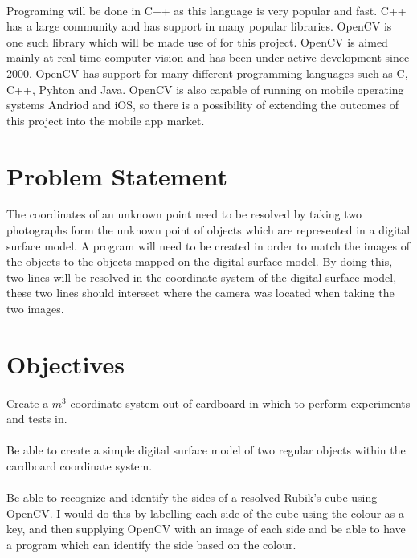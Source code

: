 \documentclass{article}
\begin{document}
\paragraph{}
Programing will be done in C++ as this language is very popular and fast. C++ has a large community and has support in many popular libraries. OpenCV is one such library which will be made use of for this project. OpenCV is aimed mainly at real-time computer vision and has been under active development since 2000. OpenCV has support for many different programming languages such as C, C++, Pyhton and Java. OpenCV is also capable of running on mobile operating systems Andriod and iOS, so there is a possibility of extending the outcomes of this project into the mobile app market.

\newpage

\section{Problem Statement}
The coordinates of an unknown point need to be resolved by taking two photographs form the unknown point of objects which are represented in a digital surface model. A program will need to be created in order to match the images of the objects to the objects mapped on the digital surface model. By doing this, two lines will be resolved in the coordinate system of the digital surface model, these two lines should intersect where the camera was located when taking the two images.

\newpage

\section{Objectives}

\paragraph{}
Create a $m^3$ coordinate system out of cardboard in which to perform experiments and tests in.

\paragraph{}
Be able to create a simple digital surface model of two regular objects within the cardboard coordinate system.

\paragraph{}
Be able to recognize and identify the sides of a resolved Rubik's cube using OpenCV. I would do this by labelling each side of the cube using the colour as a key, and then supplying OpenCV with an image of each side and be able to have a program which can identify the side based on the colour.
\end{document}
